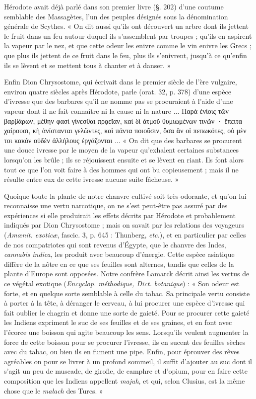 \documentclass[a4paper, 11pt, oneside, polutonikogreek, french]{article}
\begin{document}
Hérodote avait déjà parlé dans son premier livre (§. 202) d'une coutume semblable des Massagètes, l'un des peuples désignés sous la dénomination générale de Scythes. « On dit aussi qu'ils ont découvert un arbre dont ils jettent le fruit dans un feu autour duquel ils s'assemblent par troupes ; qu'ils en aspirent la vapeur par le nez, et que cette odeur les enivre comme le vin enivre les Grecs ; que plus ils jettent de ce fruit dans le feu, plus ils s'enivrent, jusqu'à ce qu'enfin ils se lèvent et se mettent tous à chanter et à danser. »

Enfin Dion Chrysostome, qui écrivait dans le premier siècle de l'ère vulgaire, environ quatre siècles après Hérodote, parle (orat. 32, p. 378) d'une espèce d'ivresse que des barbares qu'il ne nomme pas se procuraient à l'aide d'une vapeur dont il ne fait connaître ni la cause ni la nature ... Παρὰ ἐνίοις τῶν βαρβάρων, μέθην φασὶ γίνεσθαι πρᾳεῖαν, καὶ δἰ ἀτμοῦ θυμιωμένων τινῶν · ἕπειτα χαίρουσι, κὴ ἀνίστανται γελῶντες, καὶ πάντα ποιοῦσιν, ὅσα ἂν οἱ πεπωκότες, οὐ μὲν τοι κακόν οὐδὲν ἀλλήλους ἐργάζονται ... « On dit que des barbares se procurent une douce ivresse par le moyen de la vapeur qu'exhalent certaines substances lorsqu'on les brûle ; ils se réjouissent ensuite et se lèvent en riant. Ils font alors tout ce que l'on voit faire à des hommes qui ont bu copieusement ; mais il ne résulte entre eux de cette ivresse aucune suite fâcheuse. »

Quoique toute la plante de notre chanvre cultivé soit très-odorante, et qu'on lui reconnaisse une vertu narcotique, on ne s'est peut-être pas assuré par des expériences si elle produirait les effets décrits par Hérodote et probablement indiqués par Dion Chrysostome ; mais on savait par les relations des voyageurs (\emph{Amœnit. exoticæ}, fascic. 3, p. 645 : Thunberg, \emph{etc.}), et en particulier par celles de nos compatriotes qui sont revenus d'Égypte, que le chanvre des Indes, \emph{cannabis indica}, les produit avec beaucoup d'énergie. Cette espèce asiatique diffère de la nôtre en ce que ses feuilles sont alternes, tandis que celles de la plante d'Europe sont opposées. Notre confrère Lamarck décrit ainsi les vertus de ce végétal exotique (\emph{Encyclop. méthodique, Dict. botanique}) : « Son odeur est forte, et en quelque sorte semblable à celle du tabac. Sa principale vertu consiste à porter à la tête, à déranger le cerveau, à lui procurer une espèce d'ivresse qui fait oublier le chagrin et donne une sorte de gaieté. Pour se procurer cette gaieté les Indiens expriment le suc de ses feuilles et de ses graines, et en font avec l'écorce une boisson qui agite beaucoup les sens. Lorsqu'ils veulent augmenter la force de cette boisson pour se procurer l'ivresse, ils en sucent des feuilles sèches avec du tabac, ou bien ils en fument une pipe. Enfin, pour éprouver des rêves agréables on pour se livrer à un profond sommeil, il suffit d'ajouter au suc dont il s'agit un peu de muscade, de girofle, de camphre et d'opium, pour en faire cette composition que les Indiens appellent \emph{majuh}, et qui, selon Clusius, est la même chose que le \emph{malach} des Turcs. »
\end{document}
